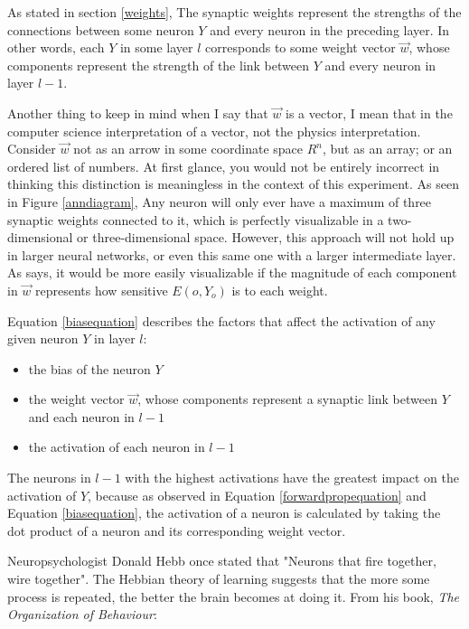 \documentclass[12pt]{article}
\begin{document}
As stated in section \ref{weights}, The synaptic weights represent the strengths of the connections between some neuron $Y$ and every neuron in the preceding layer. In other words, each $Y$ in some layer $l$ corresponds to some weight vector $\vec w$, whose components represent the strength of the link between $Y$ and every neuron in layer $l-1$.

Another thing to keep in mind when I say that $\vec w$ is a vector, I mean that in the computer science interpretation of a vector, not the physics interpretation. Consider $\vec{w}$ not as an arrow in some coordinate space $R^n$, but as an array; or an ordered list of numbers. At first glance, you would not be entirely incorrect in thinking this distinction is meaningless in the context of this experiment. As seen in Figure \ref{anndiagram}, Any neuron will only ever have a maximum of three synaptic weights connected to it, which is perfectly visualizable in a two-dimensional or three-dimensional space. However, this approach will not hold up in larger neural networks, or even this same one with a larger intermediate layer. As \textcite{DeepLearningCh3} says, it would be more easily visualizable if the magnitude of each component in $\vec w$ represents how sensitive $E(o, Y_o)$ is to each weight.

Equation \ref{biasequation} describes the factors that affect the activation of any given neuron $Y$ in layer $l$:

\begin{itemize}
  \item the bias of the neuron $Y$
  \item the weight vector $\vec{w}$, whose components represent a synaptic link between $Y$ and each neuron in $l - 1$
  \item the activation of each neuron in $l - 1$
\end{itemize}

The neurons in $l - 1$ with the highest activations have the greatest impact on the activation of $Y$, because as observed in Equation \ref{forwardpropequation} and Equation \ref{biasequation}, the activation of a neuron is calculated by taking the dot product of a neuron and its corresponding weight vector.

Neuropsychologist Donald Hebb once stated that "Neurons that fire together, wire together". The Hebbian theory of learning suggests that the more some process is repeated, the better the brain becomes at doing it. From his book, \textit{The Organization of Behaviour}:
\end{document}
